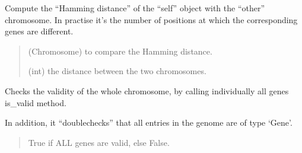 \documentclass[letterpaper,10pt,english]{sphinxmanual}
\begin{document}
\begin{fulllineitems}
\begin{fulllineitems}
\label{\detokenize{pygenalgo.genome:pygenalgo.genome.chromosome.Chromosome.hamming_distance}}
\pysigstartsignatures
{}
\pysigstopsignatures
\sphinxAtStartPar
Compute the “Hamming distance” of the “self” object with the
“other” chromosome. In practise it’s the number of positions
at which the corresponding genes are different.
\begin{quote}\begin{description}
\sphinxAtStartPar
{} \textendash{} (Chromosome) to compare the Hamming distance.

\sphinxAtStartPar
(int) the distance between the two chromosomes.

\end{description}\end{quote}

\end{fulllineitems}


\begin{fulllineitems}
\label{\detokenize{pygenalgo.genome:pygenalgo.genome.chromosome.Chromosome.is_genome_valid}}
\pysigstartsignatures
{}
\pysigstopsignatures
\sphinxAtStartPar
Checks the validity of the whole chromosome, by
calling individually all genes is\_valid method.

\sphinxAtStartPar
In addition, it “double\sphinxhyphen{}checks” that all entries
in the genome are of type ‘Gene’.
\begin{quote}\begin{description}
\sphinxAtStartPar
True if ALL genes are valid, else False.

\end{description}\end{quote}

\end{fulllineitems}



\end{fulllineitems}
\end{document}
